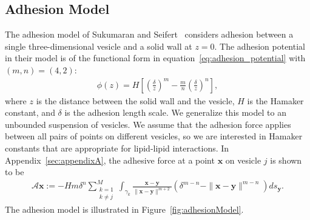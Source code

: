 \documentclass[prf,superscriptaddress,showpacs]{revtex4-1}
\renewcommand{\AA}{\mathcal{A}}
\newcommand{\xx}{\mathbf{x}}
\newcommand{\yy}{\mathbf{y}}
\begin{document}
\subsection{Adhesion Model}
The adhesion model of Sukumaran and Seifert~\cite{suk-sei2001} considers
adhesion between a single three-dimensional vesicle and a solid wall at
$z=0$.  The adhesion potential in their model is of the functional form
in equation~\eqref{eq:adhesion_potential} with $(m,n) = (4,2)$:
\begin{align}
\label{eq:adhesion_potential}
  \phi(z) = H \left[ 
    \left(\frac{\delta}{z}\right)^m - \frac{m}{n} \left(\frac{\delta}{z}\right)^n \right],
\end{align}
where $z$ is the distance between the solid wall and the vesicle,
$H$ is the Hamaker constant, and $\delta$ is the adhesion length
scale.  We generalize this model to an unbounded suspension of vesicles.
We assume that the adhesion force applies between all pairs of points on
different vesicles, so we are interested in Hamaker constants that are
appropriate for lipid-lipid interactions. In
Appendix~\ref{sec:appendixA}, the adhesive force at a point $\xx$ on
vesicle $j$ is shown to be
\begin{align}
  \AA\xx:=-H m \delta^{n}\sum_{\substack{k=1 \\ k \neq j}}^M 
  \int_{\gamma_k} \frac{\xx - \yy}{\|\xx - \yy\|^{m+2}} 
  \left(\delta^{m-n} - \|\xx - \yy\|^{m-n} \right) ds_\yy.
  \label{eqn:adhesionForce}
\end{align}
The adhesion model is illustrated in Figure~\ref{fig:adhesionModel}.
\end{document}
